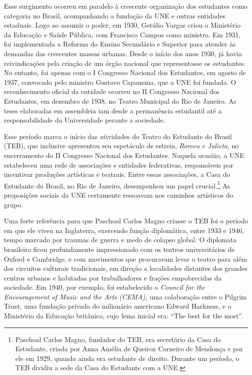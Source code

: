Esse surgimento ocorreu em paralelo à crescente organização dos
estudantes como categoria no Brasil, acompanhando a fundação da UNE e
outras entidades estaduais. Logo ao assumir o poder, em 1930, Getúlio
Vargas criou o Ministério da Educação e Saúde Pública, com Francisco
Campos como ministro. Em 1931, foi implementada a Reforma do Ensino
Secundário e Superior para atender às demandas das crescentes massas
urbanas. Desde o início dos anos 1930, já havia reivindicações pela
criação de um órgão nacional que representasse os estudantes. No
entanto, foi apenas com o I Congresso Nacional dos Estudantes, em agosto
de 1937, convocado pelo ministro Gustavo Capanema, que a UNE foi
fundada. O reconhecimento oficial da entidade ocorreu no II Congresso
Nacional dos Estudantes, em dezembro de 1938, no Teatro Municipal do Rio
de Janeiro. As teses elaboradas em assembleia iam desde a permanência
estudantil até a responsabilidade da Universidade perante a sociedade.

Esse período marca o início das atividades do Teatro do Estudante do
Brasil (TEB), que inclusive apresentou seu espetáculo de estreia,
\textit{Romeu e Julieta}, no encerramento do II Congresso Nacional dos
Estudantes. Naquela ocasião, a UNE estabeleceu uma rede de associações e
entidades federativas, responsáveis por incentivar produções artísticas
e teatrais. Entre essas associações, a Casa do Estudante do Brasil, no
Rio de Janeiro, desempenhou um papel crucial.\footnote{Paschoal Carlos
  Magno, fundador do TEB, era secretário da Casa do Estudante, criada
  por Anna Amélia de Queiroz Carneiro de Mendonça e por ele em 1929,
  quando ainda era estudante de direito. Durante um período, o TEB
  dividiu a sede da Casa do Estudante com a UNE.} As proposições sociais
da UNE certamente ressoavam nos caminhos artísticos do grupo.

Uma forte referência para que Paschoal Carlos Magno criasse o TEB foi o
período em que ele viveu na Inglaterra, exercendo função diplomática,
entre 1933 e 1946, tempo marcado por traumas de guerra e medo de colapso
global. O diplomata brasileiro ficou profundamente impressionado com os
teatros universitários de Oxford e Cambridge, e com movimentos que
procuravam levar o teatro para além dos circuitos culturais
tradicionais, em direção a localidades distantes dos grandes centros
urbanos e habitadas por trabalhadores e frações empobrecidas da
sociedade. Em 1940, por exemplo, foi estabelecido o \textit{Council for the
Encouragement of Music and the Arts (CEMA),} uma colaboração entre o
Pilgrim Trust, uma fundação privada do milionário americano Edward
Harkness, e o Ministério da Educação britânico, cujo lema inicial era:
“The best for the most”.

